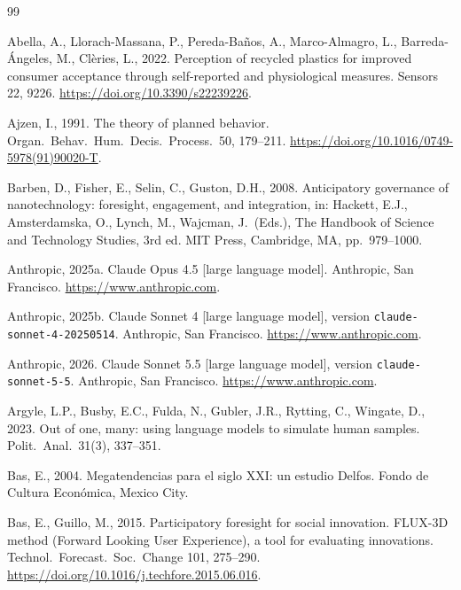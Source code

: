
\begin{thebibliography}{99}

Abella, A., Llorach-Massana, P., Pereda-Ba\~nos, A., Marco-Almagro, L., Barreda-\'Angeles, M.,
Cl\`eries, L., 2022. Perception of recycled plastics for improved consumer acceptance through
self-reported and physiological measures. Sensors 22, 9226.
\url{https://doi.org/10.3390/s22239226}.

Ajzen, I., 1991. The theory of planned behavior. Organ.\ Behav.\ Hum.\ Decis.\ Process.\ 50,
179--211. \url{https://doi.org/10.1016/0749-5978(91)90020-T}.

Barben, D., Fisher, E., Selin, C., Guston, D.H., 2008. Anticipatory governance of
nanotechnology: foresight, engagement, and integration, in: Hackett, E.J., Amsterdamska, O.,
Lynch, M., Wajcman, J.\ (Eds.), The Handbook of Science and Technology Studies, 3rd ed.
MIT Press, Cambridge, MA, pp.\ 979--1000.


Anthropic, 2025a. Claude Opus 4.5 [large language model]. Anthropic, San Francisco.
\url{https://www.anthropic.com}. 

Anthropic, 2025b. Claude Sonnet 4 [large language model], version \texttt{claude-sonnet-4-20250514}.
Anthropic, San Francisco. \url{https://www.anthropic.com}.

Anthropic, 2026. Claude Sonnet 5.5 [large language model], version \texttt{claude-sonnet-5-5}.
Anthropic, San Francisco. \url{https://www.anthropic.com}. 

Argyle, L.P., Busby, E.C., Fulda, N., Gubler, J.R., Rytting, C., Wingate, D., 2023. Out of one,
many: using language models to simulate human samples. Polit.\ Anal.\ 31(3), 337--351.

Bas, E., 2004. Megatendencias para el siglo XXI: un estudio Delfos. Fondo de Cultura
Econ\'omica, Mexico City.

Bas, E., Guillo, M., 2015. Participatory foresight for social innovation. FLUX-3D method
(Forward Looking User Experience), a tool for evaluating innovations. Technol.\ Forecast.\
Soc.\ Change 101, 275--290. \url{https://doi.org/10.1016/j.techfore.2015.06.016}.


\end{thebibliography}
